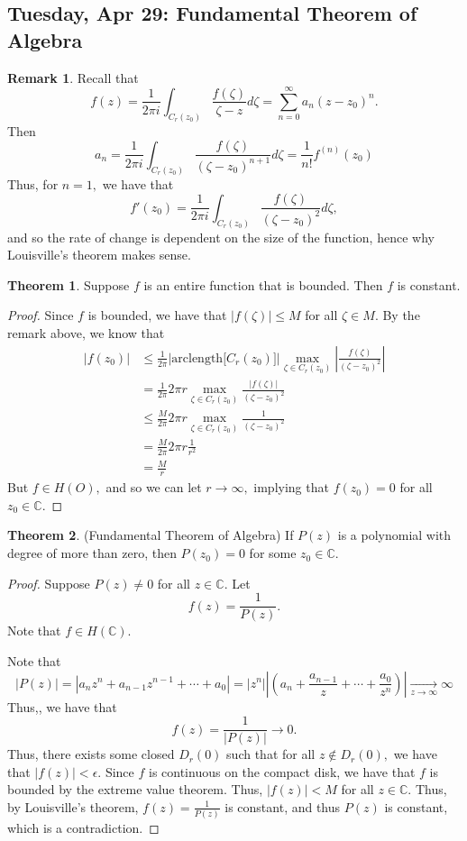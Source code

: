 \documentclass[10pt, oneside]{article}
\newcommand{\bbC}{\mathbb{C}}
\theoremstyle{definition}
\newtheorem{thm}{Theorem}
\newtheorem{rem}{Remark}
\begin{document}
\newpage
\subsection{Tuesday, Apr 29: Fundamental Theorem of Algebra}
\begin{rem}
    Recall that 
    \[f(z) = \frac{1}{2\pi i }\int_{C_r(z_0)}\frac{f(\zeta)}{\zeta - z}d\zeta = \sum_{n=0}^\infty a_n (z- z_0)^n.\] Then
    \[a_n = \frac{1}{2\pi i}\int_{C_{r}(z_0)}\frac{f(\zeta)}{(\zeta - z_0)^{n+1}}d\zeta = \frac{1}{n!}f^{(n)}(z_0)\]
Thus, for $n = 1,$ we have that 
\[f'(z_0) = \frac{1}{2\pi i} \int_{C_r(z_0)}\frac{f(\zeta)}{(\zeta- z_0)^2}d\zeta,\] and so the rate of change is dependent on the size of the function, hence why Louisville's theorem makes sense.
\end{rem}
\begin{thm}
    Suppose $f$ is an entire function that is bounded. Then $f$ is constant.
\end{thm}
\begin{proof}
Since $f$ is bounded, we have that $|f(\zeta)| \leq M$ for all $\zeta\in M.$
    By the remark above, we know that 
    \begin{align*}
        |f(z_0)| &\leq \frac{1}{2\pi }\big|\text{arclength}\big[C_r(z_0)\big]\big| \max_{\zeta \in C_r(z_0)} |\frac{f(\zeta)}{(\zeta - z_0)^2}|\\
        &= \frac{1}{2\pi }2\pi r   \max_{\zeta \in C_r(z_0)} \frac{|f(\zeta)|}{(\zeta - z_0)^2}\\
        &\leq \frac{M}{2\pi }2\pi  r  \max_{\zeta \in C_r(z_0)} \frac{1}{(\zeta - z_0)^2}\\
        &= \frac{M}{2\pi }2\pi r \frac{1}{r^2}\\
        &= \frac{M}{r}
    \end{align*}
    But $f \in H(O),$ and so we can let $r\to \infty,$ implying that $f(z_0) = 0$ for all $z_0 \in \bbC.$
\end{proof}

\begin{thm}
    (Fundamental Theorem of Algebra) If $P(z)$ is a polynomial with degree of more than zero, then $P(z_0) = 0$ for some $z_0 \in \bbC.$
\end{thm}
\begin{proof}
    Suppose $P(z) \neq 0$ for all $z \in \bbC.$ Let 
    \[f(z) = \frac{1}{P(z)}.\] Note that $f \in H(\bbC).$ 

    Note that 
    \[|P(z)| = |a_nz^n + a_{n-1}z^{n-1} + \cdots + a_0| = |z^n|\left|(a_n + \frac{a_{n-1}}{z} + \cdots + \frac{a_0}{z^n})\right| \xrightarrow[z\to \infty]{} \infty\] Thus,, we have that 
    \[f(z) = \frac{1}{|P(z)|}\to 0.\] Thus, there exists some closed $D_r(0)$ such that for all $z\notin D_r(0),$ we have that $|f(z)| < \epsilon.$ Since $f$ is continuous on the compact disk, we have that $f$ is bounded by the extreme value theorem. Thus, $|f(z)| < M$ for all $z\in \bbC.$ Thus, by Louisville's theorem, $f(z) = \frac{1}{P(z)}$ is constant, and thus $P(z)$ is constant, which is a contradiction.
\end{proof}
\end{document}
